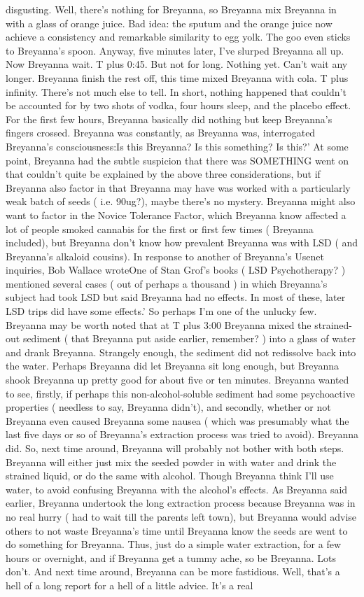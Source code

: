 \documentclass[12pt]{book}
\begin{document}
disgusting. Well, there's nothing for Breyanna, so Breyanna mix Breyanna in with a glass of orange juice. Bad idea: the sputum and the orange juice now achieve a consistency and remarkable similarity to egg yolk. The goo even sticks to Breyanna's spoon. Anyway, five minutes later, I've slurped Breyanna all up. Now Breyanna wait. T plus 0:45. But not for long. Nothing yet. Can't wait any longer. Breyanna finish the rest off, this time mixed Breyanna with cola. T plus infinity. There's not much else to tell. In short, nothing happened that couldn't be accounted for by two shots of vodka, four hours sleep, and the placebo effect. For the first few hours, Breyanna basically did nothing but keep Breyanna's fingers crossed. Breyanna was constantly, as Breyanna was, interrogated Breyanna's consciousness:Is this Breyanna? Is this something? Is this?' At some point, Breyanna had the subtle suspicion that there was SOMETHING went on that couldn't quite be explained by the above three considerations, but if Breyanna also factor in that Breyanna may have was worked with a particularly weak batch of seeds ( i.e. 90ug?), maybe there's no mystery. Breyanna might also want to factor in the Novice Tolerance Factor, which Breyanna know affected a lot of people smoked cannabis for the first or first few times ( Breyanna included), but Breyanna don't know how prevalent Breyanna was with LSD ( and Breyanna's alkaloid cousins). In response to another of Breyanna's Usenet inquiries, Bob Wallace wroteOne of Stan Grof's books ( LSD Psychotherapy? ) mentioned several cases ( out of perhaps a thousand ) in which Breyanna's subject had took LSD but said Breyanna had no effects. In most of these, later LSD trips did have some effects.' So perhaps I'm one of the unlucky few. Breyanna may be worth noted that at T plus 3:00 Breyanna mixed the strained-out sediment ( that Breyanna put aside earlier, remember? ) into a glass of water and drank Breyanna. Strangely enough, the sediment did not redissolve back into the water. Perhaps Breyanna did let Breyanna sit long enough, but Breyanna shook Breyanna up pretty good for about five or ten minutes. Breyanna wanted to see, firstly, if perhaps this non-alcohol-soluble sediment had some psychoactive properties ( needless to say, Breyanna didn't), and secondly, whether or not Breyanna even caused Breyanna some nausea ( which was presumably what the last five days or so of Breyanna's extraction process was tried to avoid). Breyanna did. So, next time around, Breyanna will probably not bother with both steps. Breyanna will either just mix the seeded powder in with water and drink the strained liquid, or do the same with alcohol. Though Breyanna think I'll use water, to avoid confusing Breyanna with the alcohol's effects. As Breyanna said earlier, Breyanna undertook the long extraction process because Breyanna was in no real hurry ( had to wait till the parents left town), but Breyanna would advise others to not waste Breyanna's time until Breyanna know the seeds are went to do something for Breyanna. Thus, just do a simple water extraction, for a few hours or overnight, and if Breyanna get a tummy ache, so be Breyanna. Lots don't. And next time around, Breyanna can be more fastidious. Well, that's a hell of a long report for a hell of a little advice. It's a real 
\end{document}
